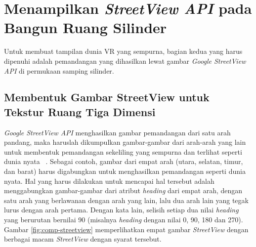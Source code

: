
\section{Menampilkan \textit{StreetView API} pada Bangun Ruang Silinder}
Untuk membuat tampilan dunia VR yang sempurna, bagian kedua yang harus dipenuhi adalah pemandangan yang dihasilkan lewat gambar \textit{Google StreetView API} di permukaan samping silinder. 

\subsection{Membentuk Gambar StreetView untuk Tekstur Ruang Tiga Dimensi}
\label{subs:streetview-integration}

\textit{Google StreetView API} menghasilkan gambar pemandangan dari satu arah pandang, maka haruslah dikumpulkan gambar-gambar dari arah-arah yang lain untuk membentuk pemandangan sekeliling yang sempurna dan terlihat seperti dunia nyata ~\cite{streetview-api}. Sebagai contoh, gambar dari empat arah (utara, selatan, timur, dan barat) harus digabungkan untuk menghasilkan pemandangan seperti  dunia nyata. Hal yang harus dilakukan untuk mencapai hal tersebut adalah menggabungkan gambar-gambar dari atribut \textit{heading} dari empat arah, dengan satu arah yang berlawanan dengan arah yang lain, lalu dua arah lain yang tegak lurus dengan arah pertama. Dengan kata lain, selisih setiap dua nilai \textit{heading} yang berurutan  bernilai 90 (misalnya \textit{heading} dengan nilai 0, 90, 180 dan 270). Gambar \ref{fig:comp-streetview} memperlihatkan empat gambar \textit{StreetView} dengan berbagai macam \textit{StreetView} dengan syarat tersebut.

